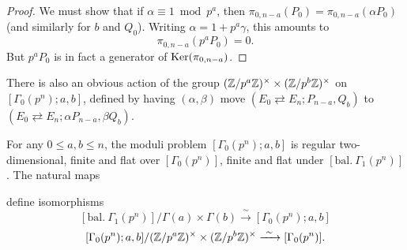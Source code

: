 \begin{proof}
We must show that if $\alpha \equiv 1 \bmod p^a$, then $\pi_{0,n-a}(P_0) = \pi_{0,n-a}(\alpha P_0)$ (and similarly for $b$ and $Q_0$). Writing $\alpha = 1 + p^a\gamma$, this amounts to
\[
\pi_{0,n-a}(p^a P_0) = 0 .
\]
But $p^a P_0$ is in fact a generator of $\operatorname{Ker}(\pi_{0,n-a})$.
\end{proof}

There is also an obvious action of the group $(\mathbb{Z}/p^a\mathbb{Z})^\times \times (\mathbb{Z}/p^b\mathbb{Z})^\times$ on $[\Gamma_0(p^n); a, b]$, defined by having $(\alpha,\beta)$ move $(E_0 \rightleftarrows E_n; P_{n-a}, Q_b)$ to $(E_0 \rightleftarrows E_n; \alpha P_{n-a}, \beta Q_b)$.

\begin{kthm}\label{thm:7.9.6}
For any $0 \leq a, b \leq n$, the moduli problem $[\Gamma_0(p^n); a, b]$ is regular two-dimensional, finite and flat over $[\Gamma_0(p^n)]$, finite and flat under $[\mathrm{bal.}\ \Gamma_1(p^n)]$. The natural maps
\begin{center}
\end{center}
define isomorphisms
\[
[\mathrm{bal.}\ \Gamma_1(p^n)]/\Gamma(a) \times \Gamma(b) \xrightarrow{\ \sim\ } [\Gamma_0(p^n); a, b]
\]
\[
[\Gamma_0(p^n); a, b]/(\mathbb{Z}/p^a\mathbb{Z})^\times \times (\mathbb{Z}/p^b\mathbb{Z})^\times \xrightarrow{\ \sim\ } [\Gamma_0(p^n)] .
\]
\end{kthm}

